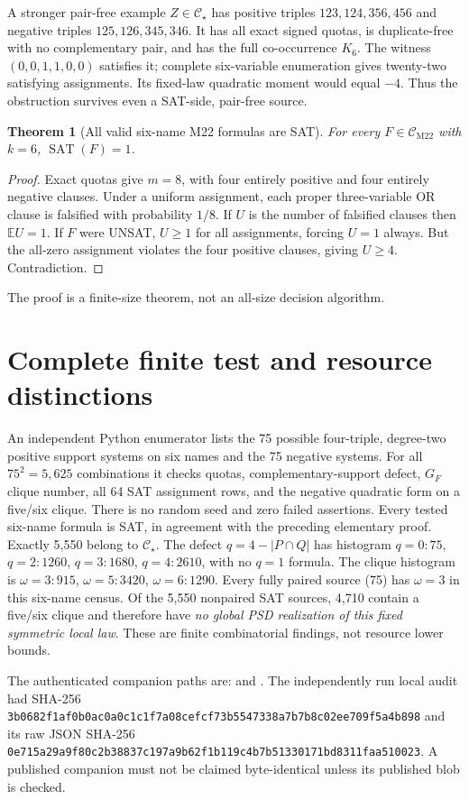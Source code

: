 \documentclass[11pt]{article}
\newtheorem{theorem}{Theorem}
\newcommand{\CM}{\mathcal C_{\mathrm{M22}}}
\newcommand{\CS}{\mathcal C_\star}
\begin{document}
A stronger pair-free example $Z\in\CS$ has positive triples $123,124,356,456$ and negative triples $125,126,345,346$. It has all exact signed quotas, is duplicate-free with no complementary pair, and has the full co-occurrence $K_6$. The witness $(0,0,1,1,0,0)$ satisfies it; complete six-variable enumeration gives twenty-two satisfying assignments. Its fixed-law quadratic moment would equal $-4$. Thus the obstruction survives even a SAT-side, pair-free source.

\begin{theorem}[All valid six-name M22 formulas are SAT]
For every $F\in\CM$ with $k=6$, $\operatorname{SAT}(F)=1$.
\end{theorem}
\begin{proof}
Exact quotas give $m=8$, with four entirely positive and four entirely negative clauses. Under a uniform assignment, each proper three-variable OR clause is falsified with probability $1/8$. If $U$ is the number of falsified clauses then $\mathbb E U=1$. If $F$ were UNSAT, $U\ge1$ for all assignments, forcing $U=1$ always. But the all-zero assignment violates the four positive clauses, giving $U\ge4$. Contradiction.
\end{proof}
The proof is a finite-size theorem, not an all-size decision algorithm.

\section{Complete finite test and resource distinctions}
An independent Python enumerator lists the 75 possible four-triple, degree-two positive support systems on six names and the 75 negative systems. For all $75^2=5,625$ combinations it checks quotas, complementary-support defect, $G_F$ clique number, all 64 SAT assignment rows, and the negative quadratic form on a five/six clique. There is no random seed and zero failed assertions. Every tested six-name formula is SAT, in agreement with the preceding elementary proof. Exactly 5,550 belong to $\CS$. The defect $q=4-|P\cap Q|$ has histogram $q=0:75$, $q=2:1260$, $q=3:1680$, $q=4:2610$, with no $q=1$ formula. The clique histogram is $\omega=3:915$, $\omega=5:3420$, $\omega=6:1290$. Every fully paired source (75) has $\omega=3$ in this six-name census. Of the 5,550 nonpaired SAT sources, 4,710 contain a five/six clique and therefore have \emph{no global PSD realization of this fixed symmetric local law}. These are finite combinatorial findings, not resource lower bounds.

The authenticated companion paths are:
and
.
The independently run local audit had SHA-256
\texttt{3b0682f1af0b0ac0a0c1c1f7a08cefcf73b5547338a7b7b8c02ee709f5a4b898}
and its raw JSON SHA-256
\texttt{0e715a29a9f80c2b38837c197a9b62f1b119c4b7b51330171bd8311faa510023}.
A published companion must not be claimed byte-identical unless its published blob is checked.
\end{document}

